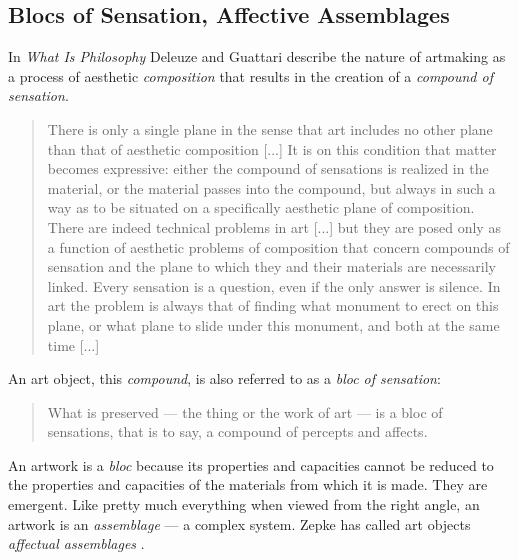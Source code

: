     \subsection{Blocs of Sensation, Affective Assemblages}\label{sec:BlocsOfSensationEntropyMachines}

        In \emph{What Is Philosophy} Deleuze and Guattari describe the nature of artmaking as a process of aesthetic \emph{composition} that results in the creation of a \emph{compound of sensation}.

        \begin{quote}
            There is only a single plane in the sense that art includes no other plane than that of aesthetic composition [...] It is on this condition that matter becomes expressive: either the compound of sensations is realized in the material, or the material passes into the compound, but always in such a way as to be situated on a specifically aesthetic plane of composition. There are indeed technical problems in art [...] but they are posed only as a function of aesthetic problems of composition that concern compounds of sensation and the plane to which they and their materials are necessarily linked. Every sensation is a question, even if the only answer is silence. In art the problem is always that of finding what monument to erect on this plane, or what plane to slide under this monument, and both at the same time [...] \citep[pp. 195-196]{DeleuzeGuattariWhatIsPhilosophy1994}
        \end{quote}

        An art object, this \emph{compound}, is also referred to as a \emph{bloc of sensation}:

        \begin{quote}
            What is preserved — the thing or the work of art — is a bloc of sensations, that is to say, a compound of percepts and affects. \citep[p.164]{DeleuzeGuattariWhatIsPhilosophy1994}
        \end{quote}

        An artwork is a \emph{bloc} because its properties and capacities cannot be reduced to the properties and capacities of the materials from which it is made. They are emergent. Like pretty much everything when viewed from the right angle, an artwork is an \emph{assemblage} — a complex system. Zepke has called art objects \emph{affectual assemblages} \citep[p.6]{ZepkeArtAsAbstrctMchn2005}.



